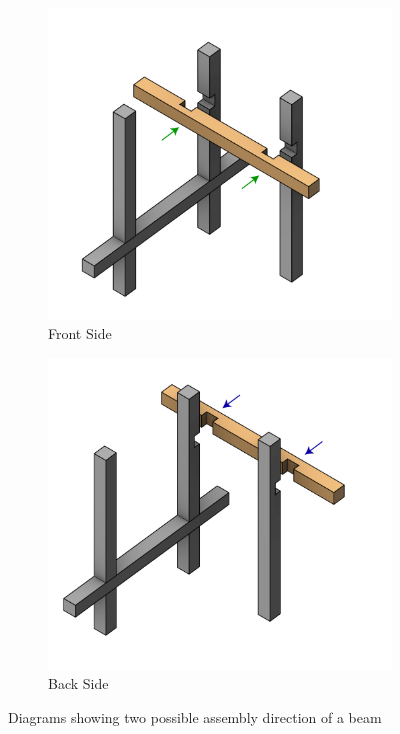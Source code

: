 \begin{figure}[!h]
    \centering
    \begin{subfigure}[b]{0.49\textwidth}
        \centering
        \includegraphics[width=\textwidth]{images/05/assembility-arrows-03.jpg}
        \caption{Front Side}
    \end{subfigure}
    \hfill
    \begin{subfigure}[b]{0.49\textwidth}
        \centering
        \includegraphics[width=\textwidth]{images/05/assembility-arrows-04.jpg}
        \caption{Back Side}
    \end{subfigure}
    \caption{Diagrams showing two possible assembly direction of a beam} 
    \label{fig:assemblability-two-joint-options}
\end{figure}


